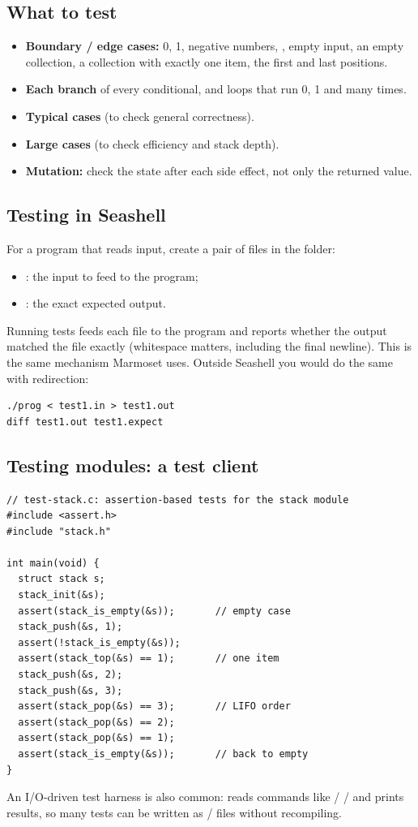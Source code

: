 \subsection{What to test}

\begin{itemize}
  \item \textbf{Boundary / edge cases:} 0, 1, negative numbers, , empty input,
    an empty collection, a collection with exactly one item, the first and last positions.
  \item \textbf{Each branch} of every conditional, and loops that run 0, 1 and many times.
  \item \textbf{Typical cases} (to check general correctness).
  \item \textbf{Large cases} (to check efficiency and stack depth).
  \item \textbf{Mutation:} check the state after each side effect, not only the returned value.
\end{itemize}

\subsection{Testing in Seashell}

For a program  that reads input, create a pair of files in the 
folder:
\begin{itemize}
  \item {}: the input to feed to the program;
  \item {}: the exact expected output.
\end{itemize}
Running tests feeds each  file to the program and reports whether the output matched
the  file exactly (whitespace matters, including the final newline). This is the
same mechanism Marmoset uses. Outside Seashell you would do the same with redirection:
\begin{lstlisting}[style=bash]
./prog < test1.in > test1.out
diff test1.out test1.expect
\end{lstlisting}

\subsection{Testing modules: a test client}

\begin{lstlisting}[style=c]
// test-stack.c: assertion-based tests for the stack module
#include <assert.h>
#include "stack.h"

int main(void) {
  struct stack s;
  stack_init(&s);
  assert(stack_is_empty(&s));       // empty case
  stack_push(&s, 1);
  assert(!stack_is_empty(&s));
  assert(stack_top(&s) == 1);       // one item
  stack_push(&s, 2);
  stack_push(&s, 3);
  assert(stack_pop(&s) == 3);       // LIFO order
  assert(stack_pop(&s) == 2);
  assert(stack_pop(&s) == 1);
  assert(stack_is_empty(&s));       // back to empty
}
\end{lstlisting}
An I/O-driven test harness is also common:  reads commands like
 /  /  and prints results, so many tests can be written as
/ files without recompiling.

